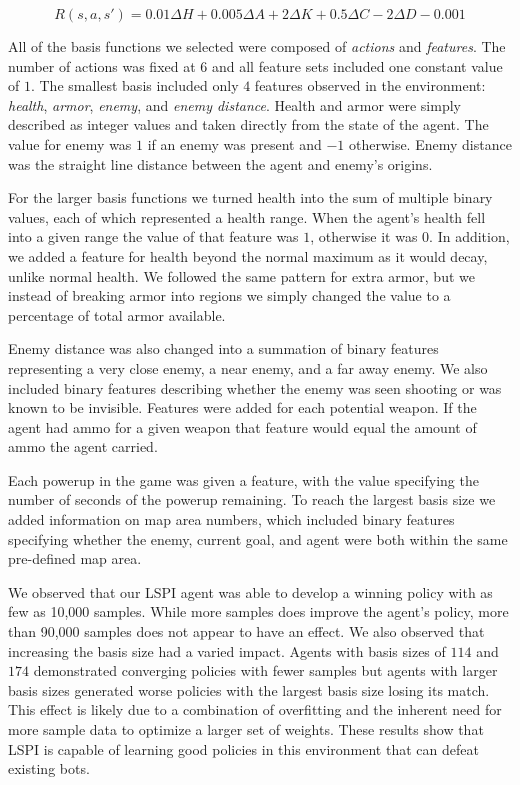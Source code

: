 \begin{equation}
    R(s,a,s') = 0.01\Delta H + 0.005\Delta A + 2\Delta K + 0.5\Delta C - 2\Delta D - 0.001 
\label{eq:reward}
\end{equation}

All of the basis functions we selected were composed of \emph{actions} and \emph{features}. The number of actions was fixed at $6$ and all feature sets included one constant value of $1$. The smallest basis included only $4$ features observed in the environment: \emph{health}, \emph{armor}, \emph{enemy}, and \emph{enemy distance}. Health and armor were simply described as integer values and taken directly from the state of the agent. The value for enemy was $1$ if an enemy was present and $-1$ otherwise. Enemy distance was the straight line distance between the agent and enemy's origins.

For the larger basis functions we turned health into the sum of multiple binary values, each of which represented a health range. When the agent's health fell into a given range the value of that feature was $1$, otherwise it was $0$. In addition, we added a feature for health beyond the normal maximum as it would decay, unlike normal health. We followed the same pattern for extra armor, but we instead of breaking armor into regions we simply changed the value to a percentage of total armor available.

Enemy distance was also changed into a summation of binary features representing a very close enemy, a near enemy, and a far away enemy. We also included binary features describing whether the enemy was seen shooting or was known to be invisible. Features were added for each potential weapon. If the agent had ammo for a given weapon that feature would equal the amount of ammo the agent carried.

Each powerup in the game was given a feature, with the value specifying the number of seconds of the powerup remaining. To reach the largest basis size we added information on map area numbers, which included binary features specifying whether the enemy, current goal, and agent were both within the same pre-defined map area.

We observed that our LSPI agent was able to develop a winning policy with as few as 10,000 samples. While more samples does improve the agent's policy, more than 90,000 samples does not appear to have an effect. We also observed that increasing the basis size had a varied impact. Agents with basis sizes of $114$ and $174$ demonstrated converging policies with fewer samples but agents with larger basis sizes generated worse policies with the largest basis size losing its match. This effect is likely due to a combination of overfitting and the inherent need for more sample data to optimize a larger set of weights. These results show that LSPI is capable of learning good policies in this environment that can defeat existing bots.

